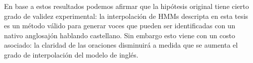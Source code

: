 En base a estos resultados podemos afirmar que la hipótesis original tiene cierto grado de validez experimental: la interpolación de HMMs descripta en esta tesis es un método válido para generar voces que pueden ser identificadas con un nativo anglosajón hablando castellano. Sin embargo esto viene con un costo asociado: la claridad de las oraciones disminuirá a medida que se aumenta el grado de interpolación del modelo de inglés.
